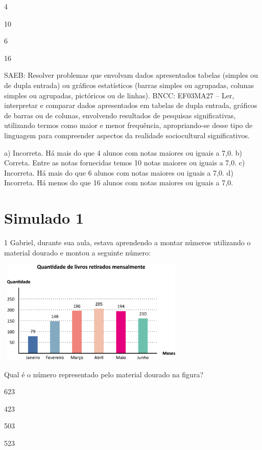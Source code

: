 \begin{multicols}{2}
{\begin{escolha}
{\begin{escolha}
\item
  4
\item
  10
\item
  6
\item
  16
\end{escolha}

SAEB: Resolver problemas que envolvam dados apresentados tabelas (simples ou de dupla entrada) ou gráficos estatísticos (barras simples ou agrupadas, colunas simples ou agrupadas, pictóricos ou de linhas). 
BNCC: EF03MA27 -- Ler, interpretar e comparar dados apresentados em tabelas de dupla entrada,
gráficos de barras ou de colunas, envolvendo resultados de pesquisas significativas, utilizando
termos como maior e menor frequência, apropriando-se desse tipo de linguagem para
compreender aspectos da realidade sociocultural significativos.

a) Incorreta. Há mais do que 4 alunos com notas maiores ou iguais a 7,0.
b) Correta. Entre as notas fornecidas temos 10 notas maiores ou iguais a 7,0.
c) Incorreta. Há mais do que 6 alunos com notas maiores ou iguais a 7,0.
d) Incorreta. Há menos do que 16 alunos com notas maiores ou iguais a 7,0.


\chapter{Simulado 1}

\num{1} Gabriel, durante sua aula, estava aprendendo a montar números utilizando o
material dourado e montou a seguinte número:


\includegraphics[width=3.55128in,height=1.93600in]{media/image106.png}

Qual é o número representado pelo material dourado na figura?

\begin{escolha}
\item
  623
\item
  423
\item
  503
\item
  523
\end{escolha}

}
\end{escolha}}
\end{multicols}

